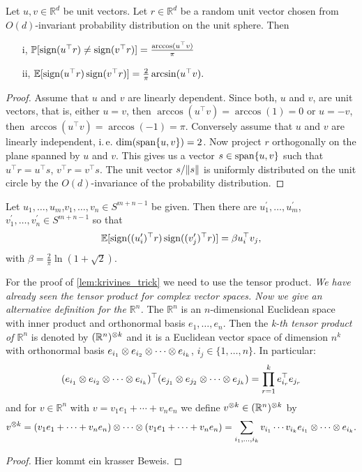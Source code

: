 \begin{lemma}
	Let $u,v\in\mathbb{R}^d$ be unit vectors. Let $r\in\mathbb{R}^d$ be a random unit vector chosen from $O(d)$-invariant probability distribution on the unit sphere. Then
	\begin{enumerate}
		\item[i,] $\mathbb{P}[\operatorname{sign}(u^\top r)\neq\operatorname{sign}(v^\top r)]=\frac{\arccos(u^\top v)}{\pi}$
		\item[ii,] $\mathbb{E}[\operatorname{sign}(u^\top r)\operatorname{sign}(v^\top r)]=\frac{2}{\pi}\arcsin(u^\top v).$
	\end{enumerate}
\end{lemma}
\begin{proof}
	Assume that $u$ and $v$ are linearly dependent. Since both, $u$ and $v$, are unit vectors, that is, either $u=v$, then $\arccos(u^\top v) = \arccos(1)=0$ or $u=-v$, then $\arccos(u^\top v) = \arccos(-1) = \pi$.
	Conversely assume that $u$ and $v$ are linearly independent, i.\,e. $\operatorname{dim}(\operatorname{span}\{u,v\})=2$. Now project $r$ orthogonally on the plane spanned by $u$ and $v$. This gives us a vector $s\in \operatorname{span}\{u,v\}$ such that $u^\top r = u^\top s$, $v^\top r = v^\top s$. The unit vector $s/ \Vert {s} \Vert$ is uniformly distributed on the unit circle by the $O(d)$-invariance of the probability distribution. 
\end{proof}

\begin{lemma}\label{lem:krivines_trick}
	Let $u_1,\dots,u_m$,$v_1,\dots,v_n\in S^{m+n-1}$ be given. Then there are $u_1^\prime,\dots,u_m^\prime$,$v_1^\prime,\dots,v_n^\prime\in S^{m+n-1}$ so that
	\begin{equation}
		\mathbb{E}[\operatorname{sign}((u_i^\prime)^\top r)\operatorname{sign}((v_j^\prime)^\top r)] = \beta u_i^\top v_j,
	\end{equation}		
	with $\beta = \frac{2}{\pi} \ln (1+\sqrt{2}).$
\end{lemma}

For the proof of \ref{lem:krivines_trick} we need to use the tensor product. \textit{We have already seen the tensor product for complex vector spaces. Now we give an alternative definition for the $\mathbb{R}^n$.} The $\mathbb{R}^n$ is an $n$-dimensional Euclidean space with inner product \sclr{\cdot}{\cdot} and orthonormal basis $e_1,\dots,e_n$.
Then the \emph{k-th tensor product of $\mathbb{R}^n$} is denoted by $(\mathbb{R}^n)^{\otimes k}$ and it is a Euclidean  vector space of dimension $n^k$ with orthonormal basis $e_{i_1}\otimes e_{i_2} \otimes \cdots \otimes e_{i_k}$, $i_j\in\{1,\dots,n\}$. In particular:
\begin{equation}
	(e_{i_1}\otimes e_{i_2} \otimes \cdots \otimes e_{i_k})^\top (e_{j_1}\otimes e_{j_2} \otimes \cdots \otimes e_{j_k}) = \prod_{r=1}^k e_{i_r}^\top e_{j_r}
\end{equation}
and for $v\in\mathbb{R}^n$ with $v=v_1e_1+\cdots +v_ne_n$ we define $v^{\otimes k} \in (\mathbb{R}^n)^{\otimes k}$ by 
\begin{equation}
	v^{\otimes k} = (v_1e_1 + \cdots + v_ne_n) \otimes \cdots \otimes (v_1e_1 + \cdots + v_ne_n) = \sum_{i_1,\dots,i_k} v_{i_1}\cdots v_{i_k} e_{i_1}\otimes\cdots\otimes e_{i_k}.
\end{equation}

\begin{proof}
	Hier kommt ein krasser Beweis.
\end{proof}